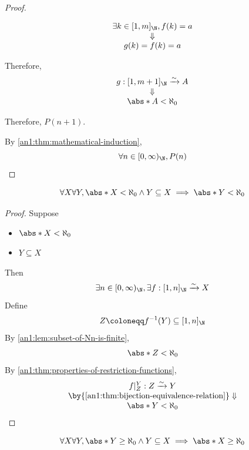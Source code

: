\begin{proof}
\begin{itemize}
\begin{itemize}
\begin{itemize}
\begin{itemize}
\[\begin{array}{c}
                                      \exists k \in [1, m]_{\N}, f(k) = a                              \\
                                      \Downarrow                                                       \\
                                      g(k) = f(k) = a
                                    \end{array}
                                  \]
                          \end{itemize}
                  \end{itemize}
                  Therefore,
                  \[
                    \begin{array}{c}
                      g: [1, m + 1]_{\N} \xrightarrow{\sim} A \\
                      \Downarrow                              \\
                      \abs*{A} < \aleph_{0}                   \\
                    \end{array}
                  \]
          \end{itemize}
          Therefore, $P(n + 1)$.
  \end{itemize}
  By \cref{an1:thm:mathematical-induction},
  \[
    \forall n \in [0, \infty)_{\N}, P(n)
  \]
\end{proof}

\begin{theorem} \label{an1:thm:subset-of-finite-set-is-finite}
  \[
    \forall X \forall Y, \abs*{X} < \aleph_{0} \land Y \subseteq X \implies \abs*{Y} < \aleph_{0}
  \]
\end{theorem}

\begin{proof}
  Suppose
  \begin{itemize}
    \item $\abs*{X} < \aleph_{0}$
    \item $Y \subseteq X$
  \end{itemize}
  Then
  \[
    \exists n \in [0, \infty)_{\N}, \exists f: [1, n]_{\N} \xrightarrow{\sim} X
  \]
  Define
  \[
    Z \coloneqq f^{-1}(Y) \subseteq [1, n]_{\N}
  \]
  By \cref{an1:lem:subset-of-Nn-is-finite},
  \[
    \abs*{Z} < \aleph_{0}
  \]
  By \cref{an1:thm:properties-of-restriction-functions},
  \[
    \begin{array}{c}
      f|_{Z}^{Y}: Z \xrightarrow{\sim} Y                            \\
      \by{\Cref{an1:thm:bijection-equivalence-relation}} \Downarrow \\
      \abs*{Y} < \aleph_{0}
    \end{array}
  \]
\end{proof}

\begin{corollary} \label{an1:cor:infinite-subset-implies-infinite}
  \[
    \forall X \forall Y, \abs*{Y} \geq \aleph_{0} \land Y \subseteq X \implies \abs*{X} \geq \aleph_{0}
  \]
\end{corollary}
